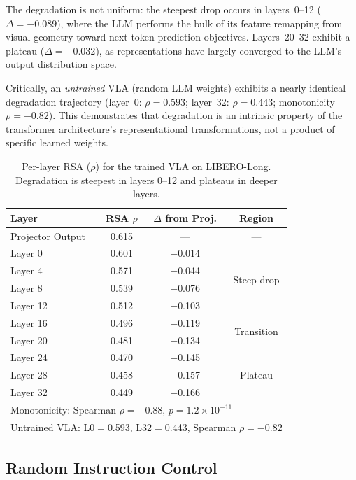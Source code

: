 \documentclass[10pt,letterpaper]{article}
\begin{document}
The degradation is not uniform: the steepest drop occurs in layers~0--12 ($\Delta{=}{-}0.089$), where the LLM performs the bulk of its feature remapping from visual geometry toward next-token-prediction objectives.
Layers~20--32 exhibit a plateau ($\Delta{=}{-}0.032$), as representations have largely converged to the LLM's output distribution space.

Critically, an \emph{untrained} VLA (random LLM weights) exhibits a nearly identical degradation trajectory (layer~0: $\rho{=}0.593$; layer~32: $\rho{=}0.443$; monotonicity $\rho{=}{-}0.82$).
This demonstrates that degradation is an intrinsic property of the transformer architecture's representational transformations, not a product of specific learned weights.

\begin{table}[t]
\centering
\caption{Per-layer RSA ($\rho$) for the trained VLA on LIBERO-Long. Degradation is steepest in layers 0--12 and plateaus in deeper layers.}
\label{tab:perlayer}
\begin{tabular}{lccc}
\toprule
\textbf{Layer} & \textbf{RSA $\rho$} & \textbf{$\Delta$ from Proj.} & \textbf{Region} \\
\midrule
Projector Output & 0.615 & --- & --- \\
Layer 0  & 0.601 & $-$0.014 & \multirow{4}{*}{Steep drop} \\
Layer 4  & 0.571 & $-$0.044 & \\
Layer 8  & 0.539 & $-$0.076 & \\
Layer 12 & 0.512 & $-$0.103 & \\
\midrule
Layer 16 & 0.496 & $-$0.119 & \multirow{2}{*}{Transition} \\
Layer 20 & 0.481 & $-$0.134 & \\
\midrule
Layer 24 & 0.470 & $-$0.145 & \multirow{3}{*}{Plateau} \\
Layer 28 & 0.458 & $-$0.157 & \\
Layer 32 & 0.449 & $-$0.166 & \\
\midrule
\multicolumn{4}{l}{\small Monotonicity: Spearman $\rho = -0.88$, $p = 1.2 \times 10^{-11}$} \\
\multicolumn{4}{l}{\small Untrained VLA: L0$=$0.593, L32$=$0.443, Spearman $\rho = -0.82$} \\
\bottomrule
\end{tabular}
\end{table}


\subsection{Random Instruction Control}
\label{sec:exp_random_inst}
\end{document}
